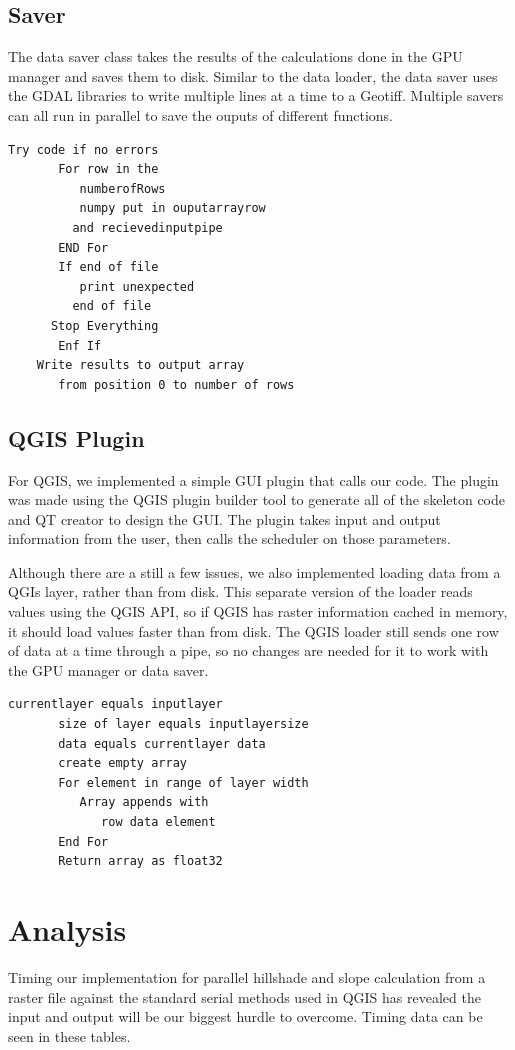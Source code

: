 \documentclass[journal]{IEEEtran}
\begin{document}
    \subsection{Saver}
    The data saver class takes the results of the calculations done in the GPU
    manager and saves them to disk. Similar to the data loader, the data saver
    uses the GDAL libraries to write multiple lines at a time to a Geotiff.
    Multiple savers can all run in parallel to save the ouputs of different
    functions.
\break
\begin{Verbatim}[frame=single, gobble=4]
    Try code if no errors
       For row in the 
          numberofRows
          numpy put in ouputarrayrow 
	     and recievedinputpipe
       END For
       If end of file
          print unexpected 
	     end of file
	  Stop Everything
       Enf If
    Write results to output array 
       from position 0 to number of rows
\end{Verbatim}


    \subsection{QGIS Plugin}
    For QGIS, we implemented a simple GUI plugin that calls our code. The plugin
    was made using the QGIS plugin builder tool to generate all of the skeleton
    code and QT creator to design the GUI. The plugin takes input and output
    information from the user, then calls the scheduler on those parameters.

    Although there are a still a few issues, we also implemented loading data
    from a QGIs layer, rather than from disk. This separate version of the loader
    reads values using the QGIS API, so if QGIS has raster information cached in
    memory, it should load values faster than from disk. The QGIS loader still
    sends one row of data at a time through a pipe, so no changes are needed
    for it to work with the GPU manager or data saver.

\begin{Verbatim}[frame=single, gobble=7]
       currentlayer equals inputlayer
       size of layer equals inputlayersize
       data equals currentlayer data
       create empty array
       For element in range of layer width
          Array appends with 
             row data element
       End For
       Return array as float32 
\end{Verbatim}
    
\section{Analysis}
Timing our implementation for parallel hillshade and slope calculation from a raster file
against the standard serial methods used in QGIS has revealed the input and
output will be our biggest hurdle to overcome. Timing data can be seen in these
tables.
\end{document}
